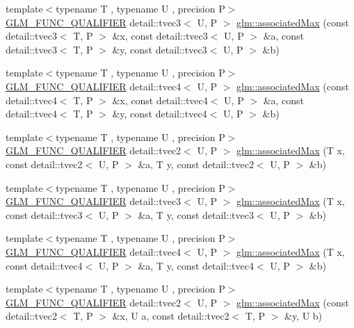 \begin{DoxyCompactItemize}
{\footnotesize template$<$typename T , typename U , precision P$>$ }\\\hyperlink{setup_8hpp_a33fdea6f91c5f834105f7415e2a64407}{G\+L\+M\+\_\+\+F\+U\+N\+C\+\_\+\+Q\+U\+A\+L\+I\+F\+I\+ER} detail\+::tvec3$<$ U, P $>$ \hyperlink{namespaceglm_ad000be1eb1773a86069dbb63ae0d25b7}{glm\+::associated\+Max} (const detail\+::tvec3$<$ T, P $>$ \&x, const detail\+::tvec3$<$ U, P $>$ \&a, const detail\+::tvec3$<$ T, P $>$ \&y, const detail\+::tvec3$<$ U, P $>$ \&b)
\item 
{\footnotesize template$<$typename T , typename U , precision P$>$ }\\\hyperlink{setup_8hpp_a33fdea6f91c5f834105f7415e2a64407}{G\+L\+M\+\_\+\+F\+U\+N\+C\+\_\+\+Q\+U\+A\+L\+I\+F\+I\+ER} detail\+::tvec4$<$ U, P $>$ \hyperlink{namespaceglm_a520ea02280ceecedc01f2857b27d40e4}{glm\+::associated\+Max} (const detail\+::tvec4$<$ T, P $>$ \&x, const detail\+::tvec4$<$ U, P $>$ \&a, const detail\+::tvec4$<$ T, P $>$ \&y, const detail\+::tvec4$<$ U, P $>$ \&b)
\item 
{\footnotesize template$<$typename T , typename U , precision P$>$ }\\\hyperlink{setup_8hpp_a33fdea6f91c5f834105f7415e2a64407}{G\+L\+M\+\_\+\+F\+U\+N\+C\+\_\+\+Q\+U\+A\+L\+I\+F\+I\+ER} detail\+::tvec2$<$ U, P $>$ \hyperlink{namespaceglm_ac87c6da2e1f2cb4e841aa62635dc0166}{glm\+::associated\+Max} (T x, const detail\+::tvec2$<$ U, P $>$ \&a, T y, const detail\+::tvec2$<$ U, P $>$ \&b)
\item 
{\footnotesize template$<$typename T , typename U , precision P$>$ }\\\hyperlink{setup_8hpp_a33fdea6f91c5f834105f7415e2a64407}{G\+L\+M\+\_\+\+F\+U\+N\+C\+\_\+\+Q\+U\+A\+L\+I\+F\+I\+ER} detail\+::tvec3$<$ U, P $>$ \hyperlink{namespaceglm_ad605ba2f1c07e4c422cdeb3aacfcaf2e}{glm\+::associated\+Max} (T x, const detail\+::tvec3$<$ U, P $>$ \&a, T y, const detail\+::tvec3$<$ U, P $>$ \&b)
\item 
{\footnotesize template$<$typename T , typename U , precision P$>$ }\\\hyperlink{setup_8hpp_a33fdea6f91c5f834105f7415e2a64407}{G\+L\+M\+\_\+\+F\+U\+N\+C\+\_\+\+Q\+U\+A\+L\+I\+F\+I\+ER} detail\+::tvec4$<$ U, P $>$ \hyperlink{namespaceglm_ac57a94defad50b236a7a06b1a4989c20}{glm\+::associated\+Max} (T x, const detail\+::tvec4$<$ U, P $>$ \&a, T y, const detail\+::tvec4$<$ U, P $>$ \&b)
\item 
{\footnotesize template$<$typename T , typename U , precision P$>$ }\\\hyperlink{setup_8hpp_a33fdea6f91c5f834105f7415e2a64407}{G\+L\+M\+\_\+\+F\+U\+N\+C\+\_\+\+Q\+U\+A\+L\+I\+F\+I\+ER} detail\+::tvec2$<$ U, P $>$ \hyperlink{namespaceglm_a77b3777ffa8444c84c785eb0b788a6b1}{glm\+::associated\+Max} (const detail\+::tvec2$<$ T, P $>$ \&x, U a, const detail\+::tvec2$<$ T, P $>$ \&y, U b)

\end{DoxyCompactItemize}
